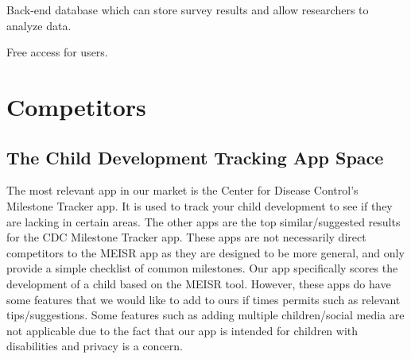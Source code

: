 Back-end database which can store survey results and allow researchers to analyze data.

Free access for users.


\newpage


\chapter{Competitors}
\label{ch:Competitors}
\section{The Child Development Tracking App Space}
The most relevant app in our market is the Center for Disease Control’s Milestone Tracker app. It is used to track your child development to see if they are lacking in certain areas. The other apps are the top similar/suggested results for the CDC Milestone Tracker app. These apps are not necessarily direct competitors to the MEISR app as they are designed to be more general, and only provide a simple checklist of common milestones. Our app specifically scores the development of a child based on the MEISR tool. However, these apps do have some features that we would like to add to ours if times permits such as relevant tips/suggestions. Some features such as adding multiple children/social media are not applicable due to the fact that our app is intended for children with disabilities and privacy is a concern.

